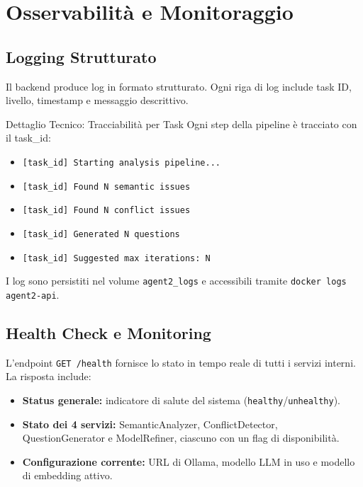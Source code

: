\documentclass[12pt,a4paper]{report}
\begin{document}
\chapter{Osservabilità e Monitoraggio}

\section{Logging Strutturato}

Il backend produce log in formato strutturato.
Ogni riga di log include task ID,
livello, timestamp e messaggio descrittivo.

\begin{technicalbox}{Dettaglio Tecnico: Tracciabilità per Task}
Ogni step della pipeline è tracciato con il task\_id:
\begin{itemize}
  \item \texttt{[task\_id] Starting analysis pipeline...}
  \item \texttt{[task\_id] Found N semantic issues}
  \item \texttt{[task\_id] Found N conflict issues}
  \item \texttt{[task\_id] Generated N questions}
  \item \texttt{[task\_id] Suggested max iterations: N}
\end{itemize}
I log sono persistiti nel volume \texttt{agent2\_logs} e accessibili
tramite \texttt{docker logs agent2-api}.
\end{technicalbox}

\section{Health Check e Monitoring}

L'endpoint \texttt{GET /health} fornisce lo stato in tempo reale di tutti
i servizi interni. La risposta include:

\begin{itemize}
  \item \textbf{Status generale:} indicatore di salute del sistema (\texttt{healthy}/\texttt{unhealthy}).
  \item \textbf{Stato dei 4 servizi:} SemanticAnalyzer, ConflictDetector, QuestionGenerator e ModelRefiner, ciascuno con un flag di disponibilità.
  \item \textbf{Configurazione corrente:} URL di Ollama, modello LLM in uso e modello di embedding attivo.
\end{itemize}
\end{document}
